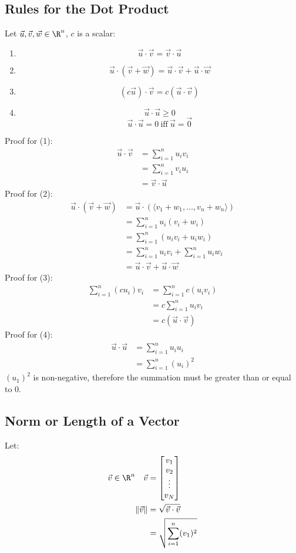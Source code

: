 \documentclass[letterpaper, 12pt]{math}
\begin{document}
\subsection*{Rules for the Dot Product}
Let \( \vec{u},\vec{v},\vec{w}\in\R^n \), \( c \) is a scalar:
\begin{enumerate}
  \item
    \[ \vec{u}\cdot\vec{v} = \vec{v}\cdot\vec{u} \]
  \item
    \[ \vec{u}\cdot(\vec{v}+\vec{w}) =
      \vec{u}\cdot\vec{v}+\vec{u}\cdot\vec{w} \]
  \item
    \[ (c\vec{u})\cdot\vec{v} = c(\vec{u}\cdot\vec{v}) \]
  \item
    \[ \vec{u}\cdot\vec{u}\geq0 \]
    \[ \vec{u}\cdot\vec{u} = 0\ \textrm{iff}\ \vec{u} = \vec{0} \]
\end{enumerate}
Proof for (1):
\begin{align*}
  \vec{u}\cdot\vec{v} &= \sum_{i=1}^nu_iv_i \\
  &= \sum_{i=1}^nv_iu_i \\
  &= \vec{v}\cdot\vec{u}
\end{align*}
Proof for (2):
\begin{align*}
  \vec{u}\cdot(\vec{v}+\vec{w}) &=
    \vec{u}\cdot(\langle v_1+w_1,\dots,v_n+w_n\rangle) \\
  &= \sum_{i=1}^nu_i(v_i+w_i) \\
  &= \sum_{i=1}^n(u_iv_i+u_iw_i) \\
  &= \sum_{i=1}^nu_iv_i+\sum_{i=1}^nu_iw_i \\
  &= \vec{u}\cdot\vec{v}+\vec{u}\cdot\vec{w}
\end{align*}
Proof for (3):
\begin{align*}
  \sum_{i=1}^n(cu_i)v_i &= \sum_{i=1}^nc(u_iv_i) \\
  &= c\sum_{i=1}^nu_iv_i \\
  &= c(\vec{u}\cdot\vec{v})
\end{align*}
Proof for (4):
\begin{align*}
  \vec{u}\cdot\vec{u} &= \sum_{i=1}^nu_iu_i \\
  &= \sum_{i=1}^n(u_i)^2
\end{align*}
\( (u_1)^2 \) is non-negative, therefore the summation must be greater than
or equal to 0.

\subsection*{Norm or Length of a Vector}
Let:
\begin{align*}
  \vec{v}\in\R^n \quad \vec{v} &= \begin{bmatrix}
    v_1 \\ v_2 \\ \vdots \\ v_N
  \end{bmatrix} \\
  \|\vec{v}\| &= \sqrt{\vec{v}\cdot\vec{v}} \\
  &= \sqrt{\sum_{i=1}^n(v_1)^2}
\end{align*}
\end{document}
